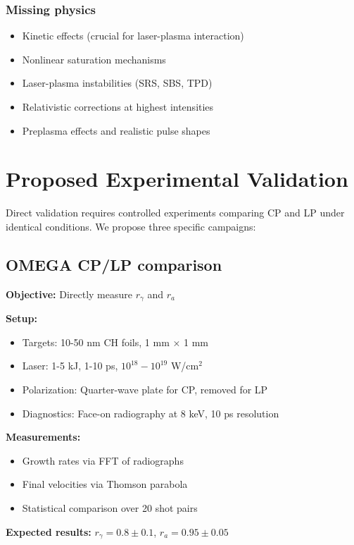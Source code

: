 \documentclass[aps,pre,twocolumn,showpacs,superscriptaddress]{revtex4-2}
\theoremstyle{definition}
\begin{document}
\subsubsection{Missing physics}
\begin{itemize}
\item Kinetic effects (crucial for laser-plasma interaction)
\item Nonlinear saturation mechanisms
\item Laser-plasma instabilities (SRS, SBS, TPD)
\item Relativistic corrections at highest intensities
\item Preplasma effects and realistic pulse shapes
\end{itemize}

\section{Proposed Experimental Validation}\label{sec:experiments}

Direct validation requires controlled experiments comparing CP and LP under identical conditions. We propose three specific campaigns:

\subsection{OMEGA CP/LP comparison}

\textbf{Objective:} Directly measure $r_\gamma$ and $r_a$

\textbf{Setup:}
\begin{itemize}
\item Targets: 10-50 nm CH foils, 1 mm × 1 mm
\item Laser: 1-5 kJ, 1-10 ps, $10^{18}-10^{19}$ W/cm$^2$
\item Polarization: Quarter-wave plate for CP, removed for LP
\item Diagnostics: Face-on radiography at 8 keV, 10 ps resolution
\end{itemize}

\textbf{Measurements:}
\begin{itemize}
\item Growth rates via FFT of radiographs
\item Final velocities via Thomson parabola
\item Statistical comparison over 20 shot pairs
\end{itemize}

\textbf{Expected results:} $r_\gamma = 0.8 \pm 0.1$, $r_a = 0.95 \pm 0.05$
\end{document}
